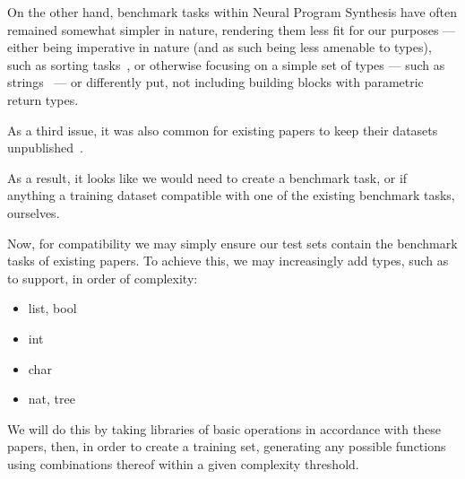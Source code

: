\documentclass{article}
\begin{document}
On the other hand, benchmark tasks within Neural Program Synthesis have often remained somewhat simpler in nature,
rendering them less fit for our purposes --- either being imperative in nature (and as such being less amenable to types),
such as sorting tasks~\citep{npi,alphanpi},
or otherwise focusing on a simple set of types --- such as strings~\citep{nsps} ---%
or differently put, not including building blocks with parametric return types.

As a third issue, it was also common for existing papers to keep their datasets unpublished~\citep{nsps,deepcoder,tamandu}.


As a result, it looks like we would need to create a benchmark task, or if anything a training dataset compatible with one of the existing benchmark tasks, ourselves.

Now, for compatibility we may simply ensure our test sets contain the benchmark tasks of existing papers.
To achieve this, we may increasingly add types, such as to support, in order of complexity:
\begin{itemize}
    \item list, bool~\citep{terpret}
    \item int~\citep{tamandu}
    \item char~\citep{typedmil}
    \item nat, tree~\citep{myth,lambda2}
\end{itemize}

We will do this by taking libraries of basic operations in accordance with these papers, then, in order to create a training set, generating any possible functions using combinations thereof within a given complexity threshold.
\end{document}
